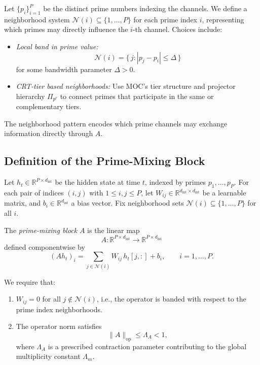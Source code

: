 \documentclass[11pt]{article}
\begin{document}
Let \(\{p_i\}_{i=1}^P\) be the distinct prime numbers indexing the channels.
We define a neighborhood system \(\mathcal{N}(i) \subseteq \{1,\dots,P\}\) for
each prime index \(i\), representing which primes may directly influence the
\(i\)-th channel. Choices include:
\begin{itemize}[leftmargin=1.5em]
  \item \emph{Local band in prime value:}
  \[
    \mathcal{N}(i) =
    \{\, j : |p_j - p_i| \le \Delta \,\}
  \]
  for some bandwidth parameter \(\Delta > 0\).
  \item \emph{CRT-tier based neighborhoods:} Use MOC's tier structure and
  projector hierarchy \(\Pi_{p^r}\) to connect primes that participate in the
  same or complementary tiers.
\end{itemize}

The neighborhood pattern encodes which prime channels may exchange information
directly through \(A\).

\subsection{Definition of the Prime-Mixing Block}

\begin{definition}
Let \(h_t \in \mathbb{R}^{P \times d_{\text{int}}}\) be the hidden state at
time \(t\), indexed by primes \(p_1,\dots,p_P\). For each pair of indices
\((i,j)\) with \(1 \le i,j \le P\), let \(W_{ij} \in \mathbb{R}^{d_{\text{int}} \times d_{\text{int}}}\)
be a learnable matrix, and \(b_i \in \mathbb{R}^{d_{\text{int}}}\) a bias
vector. Fix neighborhood sets \(\mathcal{N}(i) \subseteq \{1,\dots,P\}\) for
all \(i\).

The \emph{prime-mixing block} \(A\) is the linear map
\[
  A : \mathbb{R}^{P \times d_{\text{int}}} \to \mathbb{R}^{P \times d_{\text{int}}}
\]
defined componentwise by
\begin{equation}
  (A h_t)_i
  =
  \sum_{j \in \mathcal{N}(i)}
    W_{ij} \, h_t[j,:] + b_i,
  \qquad i = 1,\dots,P.
  \label{eq:prime-mixing}
\end{equation}

We require that:
\begin{enumerate}[label=(\alph*), leftmargin=2em]
  \item \(W_{ij} = 0\) for all \(j \notin \mathcal{N}(i)\), i.e., the operator
  is banded with respect to the prime index neighborhoods.
  \item The operator norm satisfies
  \[
    \|A\|_{\mathrm{op}} \le \Lambda_A < 1,
  \]
  where \(\Lambda_A\) is a prescribed contraction parameter contributing to
  the global multiplicity constant \(\Lambda_m\).
\end{enumerate}
\end{definition}
\end{document}
